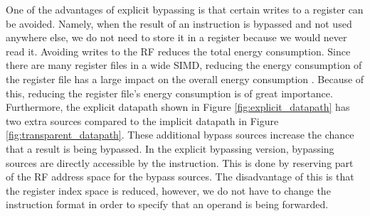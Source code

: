 

One of the advantages of explicit bypassing is that certain writes to a register can be avoided. Namely, when the result of an instruction is bypassed and not used anywhere else, we do not need to store it in a register because we would never read it. Avoiding writes to the RF reduces the total energy consumption. Since there are many register files in a wide SIMD, reducing the energy consumption of the register file has a large impact on the overall energy consumption \cite{dongrio1}. Because of this, reducing the register file's energy consumption is of great importance. Furthermore, the explicit datapath shown in Figure \ref{fig:explicit_datapath} has two extra sources compared to the implicit datapath in Figure \ref{fig:transparent_datapath}. These additional bypass sources increase the chance that a result is being bypassed. In the explicit bypassing version, bypassing sources are directly accessible by the instruction. This is done by reserving part of the RF address space for the bypass sources. The disadvantage of this is that the register index space is reduced, however, we do not have to change the instruction format in order to specify that an operand is being forwarded.


